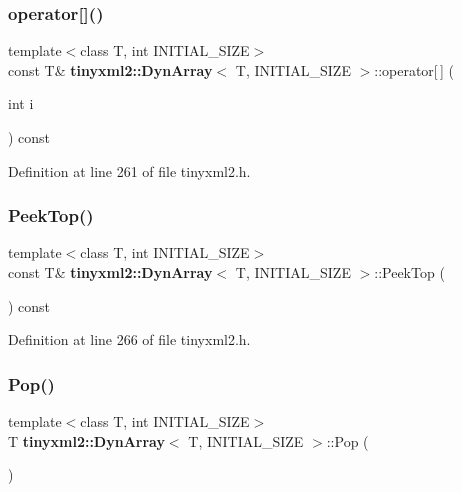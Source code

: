 \subsubsection{operator[]()\hspace{0.1cm}{\footnotesize\ttfamily [2/2]}}
{\footnotesize\ttfamily template$<$class T, int I\+N\+I\+T\+I\+A\+L\+\_\+\+S\+I\+ZE$>$ \\
const T\& \textbf{ tinyxml2\+::\+Dyn\+Array}$<$ T, I\+N\+I\+T\+I\+A\+L\+\_\+\+S\+I\+ZE $>$\+::operator[$\,$] (\begin{DoxyParamCaption}\item[{int}]{i }\end{DoxyParamCaption}) const\hspace{0.3cm}{\ttfamily [inline]}}



Definition at line 261 of file tinyxml2.\+h.

\mbox{\label{classtinyxml2_1_1_dyn_array_a5e4e1e408e646688503dec77c77c9d59}} 
\subsubsection{Peek\+Top()}
{\footnotesize\ttfamily template$<$class T, int I\+N\+I\+T\+I\+A\+L\+\_\+\+S\+I\+ZE$>$ \\
const T\& \textbf{ tinyxml2\+::\+Dyn\+Array}$<$ T, I\+N\+I\+T\+I\+A\+L\+\_\+\+S\+I\+ZE $>$\+::Peek\+Top (\begin{DoxyParamCaption}{ }\end{DoxyParamCaption}) const\hspace{0.3cm}{\ttfamily [inline]}}



Definition at line 266 of file tinyxml2.\+h.

\mbox{\label{classtinyxml2_1_1_dyn_array_a27a3f2f6f869815b6eabb3ea40cf0712}} 
\subsubsection{Pop()}
{\footnotesize\ttfamily template$<$class T, int I\+N\+I\+T\+I\+A\+L\+\_\+\+S\+I\+ZE$>$ \\
T \textbf{ tinyxml2\+::\+Dyn\+Array}$<$ T, I\+N\+I\+T\+I\+A\+L\+\_\+\+S\+I\+ZE $>$\+::Pop (\begin{DoxyParamCaption}{ }\end{DoxyParamCaption})\hspace{0.3cm}{\ttfamily [inline]}}



